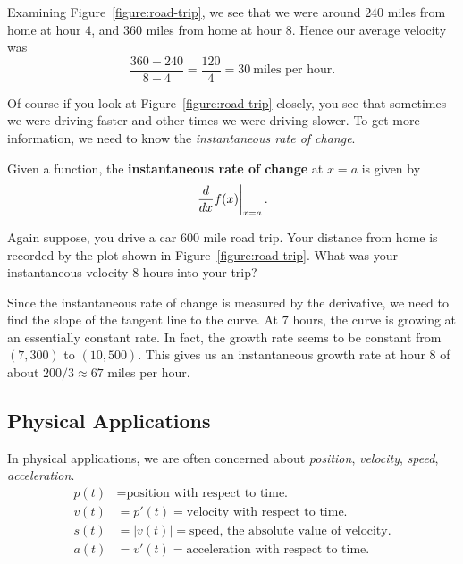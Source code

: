 \begin{solution}
Examining Figure~\ref{figure:road-trip}, we see that we were around
$240$ miles from home at hour $4$, and $360$ miles from home at hour
$8$. Hence our average velocity was
\[
\frac{360-240}{8-4} = \frac{120}{4} = 30~\text{miles per hour.}
\]
\end{solution}

Of course if you look at Figure~\ref{figure:road-trip} closely, you
see that sometimes we were driving faster and other times we were
driving slower. To get more information, we need to know the
\textit{instantaneous rate of change}.

\begin{definition}
Given a function, the \textbf{instantaneous rate of change} at $x=a$ is given by
\[
\left.\frac{d}{dx} f(x) \right|_{x=a}.
\] 
\end{definition}

\begin{example} 
Again suppose, you drive a car 600 mile road trip. Your distance from
home is recorded by the plot shown in
Figure~\ref{figure:road-trip}. What was your instantaneous velocity
$8$ hours into your trip?
\end{example}
\begin{solution}
Since the instantaneous rate of change is measured by the derivative,
we need to find the slope of the tangent line to the curve. At $7$
hours, the curve is growing at an essentially constant rate. In fact,
the growth rate seems to be constant from $(7,300)$ to
$(10,500)$. This gives us an instantaneous growth rate at hour $8$ of
about $200/3 \approx 67$ miles per hour.
\end{solution}




\subsection*{Physical Applications}

In physical applications, we are often concerned about
\textit{position}, \textit{velocity}, \textit{speed},
\textit{acceleration}.
\begin{align*}
p(t) &= \text{position with respect to time.}\\
v(t) &= p'(t) = \text{velocity with respect to time.}\\
s(t) &= |v(t)| = \text{speed, the absolute value of velocity.}\\
a(t) &=v'(t) = \text{acceleration with respect to time.}
\end{align*}

